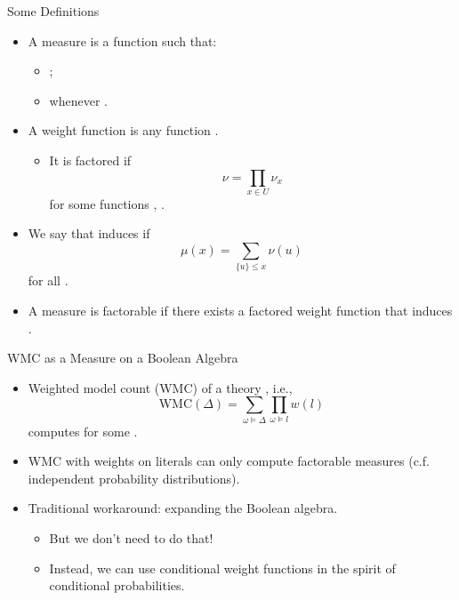 \documentclass{beamer}
\begin{document}
\begin{frame}{Some Definitions}
  \begin{itemize}
  \item A \alert{measure} is a function  such that:
    \begin{itemize}
    \item {};
    \item {} whenever .
    \end{itemize}
    \pause
  \item A \alert{weight function} is any function .
    \pause
    \begin{itemize}
    \item It is \alert{factored} if
      \[
        \nu = \prod_{x \in U} \nu_x
      \]
      for some functions , .
    \end{itemize}
    \pause
  \item We say that \structure{$\nu$} \alert{induces} \structure{$\mu$} if
    \[
      \mu(x) = \sum_{\{u\} \le x} \nu(u)
    \]
    for all .
    \pause
  \item A measure \structure{$\mu$} is \alert{factorable} if there exists a
    factored weight function \structure{$\nu$} that induces \structure{$\mu$}.
  \end{itemize}
\end{frame}

\begin{frame}{WMC as a Measure on a Boolean Algebra}
  \begin{itemize}
  \item \alert{Weighted model count} (WMC) of a theory \structure{$\Delta$},
    i.e.,
    \[
      \mathrm{WMC}(\Delta) = \sum_{\omega \models \Delta} \prod_{\omega \models
        l} w(l)
    \]
    computes  for some .
    \pause
  \item WMC with weights on literals can only compute \alert{factorable}
    measures (c.f. independent probability distributions).
  \item Traditional workaround: expanding the Boolean algebra.
    \pause
    \begin{itemize}
    \item But we don't need to do that!
    \item Instead, we can use \alert{conditional weight functions} in the spirit
      of conditional probabilities.
    \end{itemize}
  \end{itemize}
\end{frame}
\end{document}
